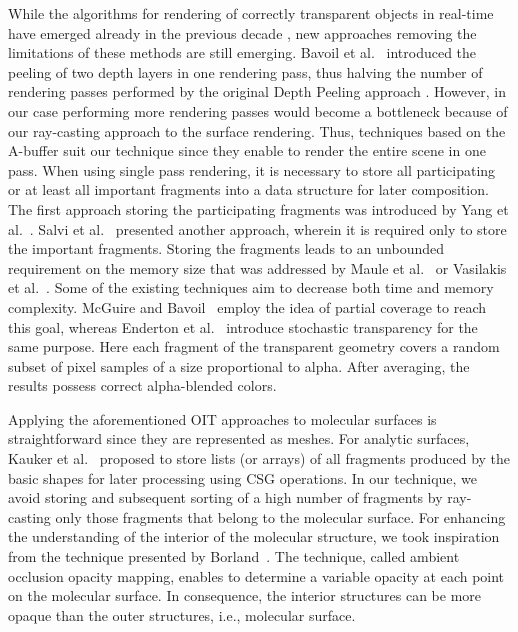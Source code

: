 While the algorithms for rendering of correctly transparent objects in real-time have emerged already in the previous decade \cite{everitt2001interactive}, new approaches removing the limitations of these methods are still emerging.
Bavoil et al.~\cite{bavoil2008order} introduced the peeling of two depth layers in one rendering pass, thus halving the number of rendering passes performed by the original Depth Peeling approach \cite{everitt2001interactive}. However, in our case performing more rendering passes would become a bottleneck because of our ray-casting approach to the surface rendering.
Thus, techniques based on the A-buffer suit our technique since they enable to render the entire scene in one pass.
When using single pass rendering, it is necessary to store all participating or at least all important fragments into a data structure for later composition.
The first approach storing the participating fragments was introduced by Yang et al.~\cite{yang2010real}. Salvi et al.~\cite{salvi2011adaptive} presented another approach, wherein it is required only to store the important fragments.
Storing the fragments leads to an unbounded requirement on the memory size that was addressed by Maule et al.~\cite{maule2012memory} or Vasilakis et al.~\cite{vasilakis2015k+buffer}.
Some of the existing techniques aim to decrease both time and memory complexity.
McGuire and Bavoil~\cite{mcguire2013weighted} employ the idea of partial coverage to reach this goal, whereas Enderton et al.~\cite{enderton2011stochastic} introduce stochastic transparency for the same purpose. 
Here each fragment of the transparent geometry covers a random subset of pixel samples of a size proportional to alpha. 
After averaging, the results possess correct alpha-blended colors. 

Applying the aforementioned OIT approaches to molecular surfaces is straightforward since they are represented as meshes.
For analytic surfaces, Kauker et al.~\cite{kauker2013rendering} proposed to store lists (or arrays) of all fragments produced by the basic shapes for later processing using CSG operations.
In our technique, we avoid storing and subsequent sorting of a high number of fragments by ray-casting only those fragments that belong to the molecular surface.
For enhancing the understanding of the interior of the molecular structure, we took inspiration from the technique presented by Borland~\cite{borland2011ambient}. 
The technique, called ambient occlusion opacity mapping, enables to determine a variable opacity at each point on the molecular surface.
In consequence, the interior structures can be more opaque than the outer structures, i.e., molecular surface.

